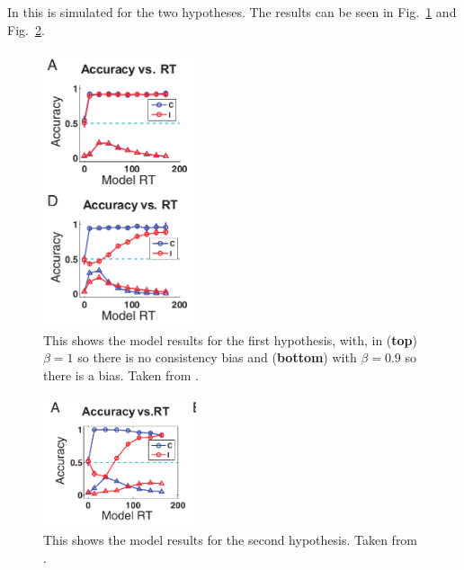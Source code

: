 \documentclass[12pt]{article}
\begin{document}
In \cite{YuDayanCohen2009} this is simulated for the two hypotheses. The results can be seen in Fig.~\ref{fig_h1} and Fig.~\ref{fig_h2}.
 



\begin{figure}[tb]
\begin{center}
  \includegraphics[width=4.5cm]{flanker_model1.png}
\end{center}
\caption{This shows the model results for the first hypothesis, with, in (\textbf{top}) $\beta=1$ so there is no consistency bias and (\textbf{bottom}) with $\beta=0.9$ so there is a bias. Taken from \cite{YuDayanCohen2009}. \label{fig_h1}}
\end{figure}


\begin{figure}[tb]
\begin{center}
  \includegraphics[width=4.5cm]{flanker_model2.png}
\end{center}
\caption{This shows the model results for the second hypothesis. Taken from \cite{YuDayanCohen2009}. \label{fig_h2}}
\end{figure}





{}
\end{document}
